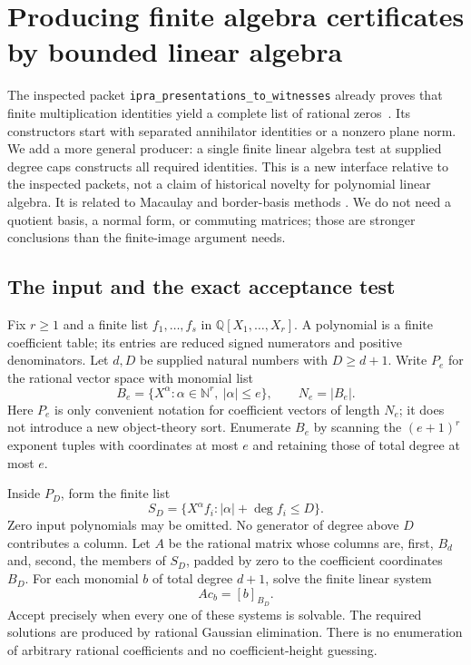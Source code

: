 \section{Producing finite algebra certificates by bounded linear algebra}
\label{sec:macaulay}

The inspected packet \texttt{ipra\_presentations\_to\_witnesses} already proves
that finite multiplication identities yield a complete list of rational
zeros~\cite{repo-witnesses}. Its constructors start with separated annihilator identities or a
nonzero plane norm. We add a more general producer: a single finite linear
algebra test at supplied degree caps constructs all required identities.
This is a new interface relative to the inspected packets, not a claim of
historical novelty for polynomial linear algebra. It is related to
Macaulay and border-basis methods \cite{mourrain2008}. We do not need a quotient basis, a
normal form, or commuting matrices; those are stronger conclusions than
the finite-image argument needs.

\subsection{The input and the exact acceptance test}

Fix $r\geq1$ and a finite list $f_1,\ldots,f_s$ in
$\mathbb Q[X_1,\ldots,X_r]$. A polynomial is a finite coefficient table;
its entries are reduced signed numerators and positive denominators.
Let $d,D$ be supplied natural numbers with $D\geq d+1$.
Write $P_e$ for the rational vector space with monomial list
\[
 B_e=\{X^\alpha: \alpha\in\mathbb N^r,\ |\alpha|\leq e\},
 \qquad N_e=|B_e|.
\]
Here $P_e$ is only convenient notation for coefficient vectors of length
$N_e$; it does not introduce a new object-theory sort.
Enumerate $B_e$ by scanning the $(e+1)^r$ exponent tuples with coordinates
at most $e$ and retaining those of total degree at most $e$.

Inside $P_D$, form the finite list
\[
 S_D=\{X^\alpha f_i:|\alpha|+\deg f_i\leq D\}.
\]
Zero input polynomials may be omitted. No generator of degree above $D$
contributes a column. Let $A$ be the rational matrix whose columns are,
first, $B_d$ and, second, the members of $S_D$, padded by zero to the
coefficient coordinates $B_D$. For each monomial $b$ of total degree
$d+1$, solve the finite linear system
\begin{equation}
                       A c_b=[b]_{B_D}.
\label{eq:border-linear-system}
\end{equation}
Accept precisely when every one of these systems is solvable.
The required solutions are produced by rational Gaussian elimination.
There is no enumeration of arbitrary rational coefficients and no
coefficient-height guessing.

